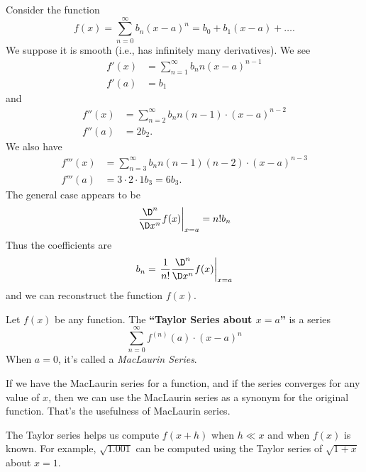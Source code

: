 \M
Consider the function
\begin{equation}
f(x)  = \sum^{\infty}_{n=0}b_{n}(x-a)^{n} = b_{0} + b_{1}(x-a) + \dots.
\end{equation}
We suppose it is smooth (i.e., has infinitely many
derivatives). We see
\begin{equation}
\begin{aligned}
f'(x) &= \sum^{\infty}_{n=1}b_{n}n(x-a)^{n-1}\\
f'(a) &= b_{1}
\end{aligned}
\end{equation}
and
\begin{equation}
\begin{aligned}
f''(x) &= \sum^{\infty}_{n=2}b_{n}n(n-1)\cdot(x-a)^{n-2}\\
f''(a) &= 2b_{2}.
\end{aligned}
\end{equation}
We also have
\begin{equation}
\begin{aligned}
f'''(x) &= \sum^{\infty}_{n=3}b_{n}n(n-1)(n-2)\cdot(x-a)^{n-3}\\
f'''(a) &= 3\cdot2\cdot1 b_{3} = 6b_{3}.
\end{aligned}
\end{equation}
The general case appears to be
\begin{equation}
\left.\frac{\D^{n}}{\D x^{n}}f(x)\right|_{x=a}=n! b_{n}
\end{equation}
Thus the coefficients are
\begin{equation}
b_{n} = \left.\frac{1}{n!}\frac{\D^{n}}{\D x^{n}}f(x)\right|_{x=a}
\end{equation}
and we can reconstruct the function $f(x)$.

Let $f(x)$ be any function. The \textbf{``Taylor Series about $x=a$''}
is a series
\begin{equation}
\sum^{\infty}_{n=0}f^{(n)}(a)\cdot(x-a)^{n}
\end{equation}
When $a=0$, it's called a \emph{MacLaurin Series}.

\begin{remark}
If we have the MacLaurin series for a function, and if the series
converges for any value of $x$, then we can use the MacLaurin
series as a synonym for the original function. That's the
usefulness of MacLaurin series.
\end{remark}
\begin{remark}
The Taylor series helps us compute $f(x+h)$ when $h\ll x$ and
when $f(x)$ is known. For example, $\sqrt{1.001}$ can be computed
using the Taylor series of $\sqrt{1+x}$ about $x=1$.
\end{remark}

